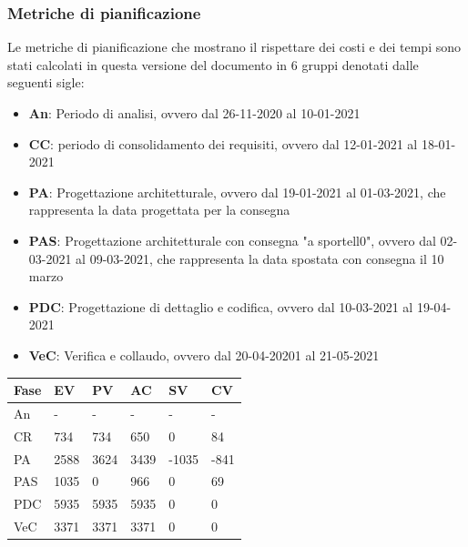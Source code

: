 \subsubsection{Metriche di pianificazione}
    Le metriche di pianificazione che mostrano il rispettare dei costi e dei tempi sono stati calcolati in questa versione del documento in 6 gruppi denotati dalle seguenti sigle:
    \begin{itemize}
        \item \textbf{An}: Periodo di analisi, ovvero dal 26-11-2020 al 10-01-2021
        \item \textbf{CC}: periodo di consolidamento dei requisiti, ovvero dal 12-01-2021 al 18-01-2021
        \item \textbf{PA}: Progettazione architetturale, ovvero dal 19-01-2021 al 01-03-2021, che rappresenta la data progettata per la consegna
        \item \textbf{PAS}: Progettazione architetturale con consegna "a sportell0", ovvero dal 02-03-2021 al 09-03-2021, che rappresenta la data spostata con consegna il 10 marzo
        \item \textbf{PDC}: Progettazione di dettaglio e codifica, ovvero dal 10-03-2021 al 19-04-2021
        \item \textbf{VeC}: Verifica e collaudo, ovvero dal 20-04-20201 al 21-05-2021
    \end{itemize}
    
    
    \begin{longtabu} to \textwidth {| X[0.1,c m] | X[0.1,c m]| X[0.1,c m]| X[0.1,c m]| X[0.1,c m]| X[0.1,c m] |}
        \hline
        \textbf{Fase} &
        \textbf{EV} &
        \textbf{PV} &
        \textbf{AC} &
        \textbf{SV} &
        \textbf{CV} \\
        \hline
        An & - & - & - & - & -  \\ 
        \hline
        CR & 734 & 734 & 650 & 0 & 84 \\
        \hline
        PA & 2588 & 3624 & 3439 & -1035 & -841\\
        \hline
        PAS & 1035 & 0 & 966 & 0 & 69 \\
        \hline
        PDC & 5935 & 5935 & 5935 & 0 & 0 \\
        \hline
        VeC & 3371 & 3371 & 3371 & 0 & 0 \\
        \hline 
        \end{longtabu}

